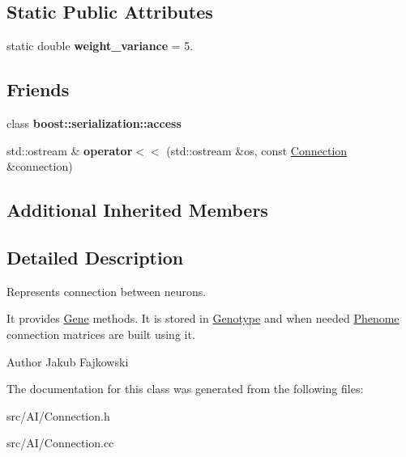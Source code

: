 \subsection*{Static Public Attributes}
\begin{DoxyCompactItemize}
\item 
static double {\bfseries weight\+\_\+variance} = 5.\hypertarget{classConnection_ad27b7debd320e5344aa09cfe178a3d27}{}\label{classConnection_ad27b7debd320e5344aa09cfe178a3d27}

\end{DoxyCompactItemize}
\subsection*{Friends}
\begin{DoxyCompactItemize}
\item 
class {\bfseries boost\+::serialization\+::access}\hypertarget{classConnection_ac98d07dd8f7b70e16ccb9a01abf56b9c}{}\label{classConnection_ac98d07dd8f7b70e16ccb9a01abf56b9c}

\item 
std\+::ostream \& {\bfseries operator$<$$<$} (std\+::ostream \&os, const \hyperlink{classConnection}{Connection} \&connection)\hypertarget{classConnection_abcafed6524d9e106791d700379ecd9c2}{}\label{classConnection_abcafed6524d9e106791d700379ecd9c2}

\end{DoxyCompactItemize}
\subsection*{Additional Inherited Members}


\subsection{Detailed Description}
Represents connection between neurons. 

It provides \hyperlink{classGene}{Gene} methods. It is stored in \hyperlink{classGenotype}{Genotype} and when needed \hyperlink{classPhenome}{Phenome} connection matrices are built using it. \begin{DoxyAuthor}{Author}
Jakub Fajkowski 
\end{DoxyAuthor}


The documentation for this class was generated from the following files\+:\begin{DoxyCompactItemize}
\item 
src/\+A\+I/Connection.\+h\item 
src/\+A\+I/Connection.\+cc\end{DoxyCompactItemize}
